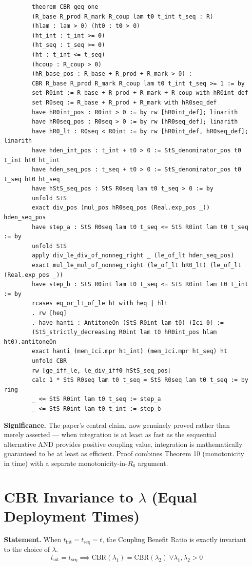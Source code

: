 \documentclass[11pt,a4paper]{article}
\begin{document}
	\begin{lstlisting}
		theorem CBR_geq_one
		(R_base R_prod R_mark R_coup lam t0 t_int t_seq : R)
		(hlam : lam > 0) (ht0 : t0 > 0)
		(ht_int : t_int >= 0)
		(ht_seq : t_seq >= 0)
		(ht : t_int <= t_seq)
		(hcoup : R_coup > 0)
		(hR_base_pos : R_base + R_prod + R_mark > 0) :
		CBR R_base R_prod R_mark R_coup lam t0 t_int t_seq >= 1 := by
		set R0int := R_base + R_prod + R_mark + R_coup with hR0int_def
		set R0seq := R_base + R_prod + R_mark with hR0seq_def
		have hR0int_pos : R0int > 0 := by rw [hR0int_def]; linarith
		have hR0seq_pos : R0seq > 0 := by rw [hR0seq_def]; linarith
		have hR0_lt : R0seq < R0int := by rw [hR0int_def, hR0seq_def]; linarith
		have hden_int_pos : t_int + t0 > 0 := StS_denominator_pos t0 t_int ht0 ht_int
		have hden_seq_pos : t_seq + t0 > 0 := StS_denominator_pos t0 t_seq ht0 ht_seq
		have hStS_seq_pos : StS R0seq lam t0 t_seq > 0 := by
		unfold StS
		exact div_pos (mul_pos hR0seq_pos (Real.exp_pos _)) hden_seq_pos
		have step_a : StS R0seq lam t0 t_seq <= StS R0int lam t0 t_seq := by
		unfold StS
		apply div_le_div_of_nonneg_right _ (le_of_lt hden_seq_pos)
		exact mul_le_mul_of_nonneg_right (le_of_lt hR0_lt) (le_of_lt (Real.exp_pos _))
		have step_b : StS R0int lam t0 t_seq <= StS R0int lam t0 t_int := by
		rcases eq_or_lt_of_le ht with heq | hlt
		. rw [heq]
		. have hanti : AntitoneOn (StS R0int lam t0) (Ici 0) :=
		(StS_strictly_decreasing R0int lam t0 hR0int_pos hlam ht0).antitoneOn
		exact hanti (mem_Ici.mpr ht_int) (mem_Ici.mpr ht_seq) ht
		unfold CBR
		rw [ge_iff_le, le_div_iff0 hStS_seq_pos]
		calc 1 * StS R0seq lam t0 t_seq = StS R0seq lam t0 t_seq := by ring
		_ <= StS R0int lam t0 t_seq := step_a
		_ <= StS R0int lam t0 t_int := step_b
	\end{lstlisting}
	
	\noindent\textbf{Significance.} The paper's central claim, now genuinely proved rather than merely asserted --- when integration is at least as fast as the sequential alternative AND provides positive coupling value, integration is mathematically guaranteed to be at least as efficient. Proof combines Theorem 10 (monotonicity in time) with a separate monotonicity-in-$R_0$ argument.
	
	\section{CBR Invariance to $\lambda$ (Equal Deployment Times)}
	
	\textbf{Statement.} When $t_{\text{int}} = t_{\text{seq}} = t$, the Coupling Benefit Ratio is exactly invariant to the choice of $\lambda$.
	\begin{equation}
		t_{\text{int}} = t_{\text{seq}} \implies \text{CBR}(\lambda_1) = \text{CBR}(\lambda_2)\ \forall \lambda_1, \lambda_2 > 0
	\end{equation}
	
\end{document}
